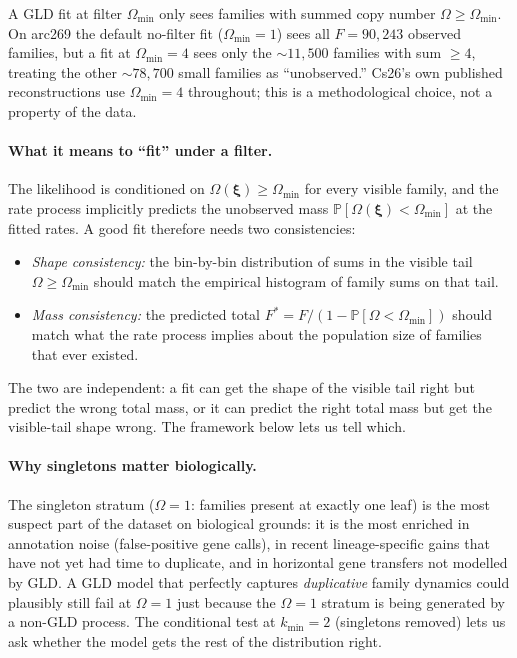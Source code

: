\documentclass[11pt]{article}
\newcommand{\PROB}{\mathbb{P}}
\newcommand{\1}{\mathbf{1}}
\newcommand{\Prof}{\boldsymbol{\xi}}
\newcommand{\Om}{\Omega}
\theoremstyle{definition}
\begin{document}
A GLD fit at filter $\Om_{\min}$ only sees families with summed copy
number $\Om \ge \Om_{\min}$. On arc269 the default no-filter fit
($\Om_{\min} = 1$) sees all $F = 90{,}243$ observed families, but a
fit at $\Om_{\min} = 4$ sees only the $\sim 11{,}500$ families with
sum $\ge 4$, treating the other $\sim 78{,}700$ small families as
``unobserved.'' Cs26's own published reconstructions use
$\Om_{\min} = 4$ throughout; this is a methodological choice, not a
property of the data.

\paragraph{What it means to ``fit'' under a filter.}
The likelihood is conditioned on $\Om(\Prof) \ge \Om_{\min}$ for every
visible family, and the rate process implicitly predicts the
unobserved mass $\PROB[\Om(\Prof) < \Om_{\min}]$ at the fitted rates.
A good fit therefore needs two consistencies:
\begin{itemize}[leftmargin=*]
\item \emph{Shape consistency:} the bin-by-bin distribution of
sums in the visible tail $\Om \ge \Om_{\min}$ should match the
empirical histogram of family sums on that tail.
\item \emph{Mass consistency:} the predicted total
$F^* = F / (1 - \PROB[\Om<\Om_{\min}])$ should match what the rate
process implies about the population size of families that ever
existed.
\end{itemize}
The two are independent: a fit can get the shape of the visible tail
right but predict the wrong total mass, or it can predict the right
total mass but get the visible-tail shape wrong. The framework
below lets us tell which.

\paragraph{Why singletons matter biologically.}
The singleton stratum ($\Om = 1$: families present at exactly one
leaf) is the most suspect part of the dataset on biological grounds:
it is the most enriched in annotation noise (false-positive gene
calls), in recent lineage-specific gains that have not yet had time
to duplicate, and in horizontal gene transfers not modelled by GLD.
A GLD model that perfectly captures \emph{duplicative} family
dynamics could plausibly still fail at $\Om = 1$ just because the
$\Om=1$ stratum is being generated by a non-GLD process. The
conditional test at $k_{\min} = 2$ (singletons removed) lets us ask
whether the model gets the rest of the distribution right.
\end{document}

